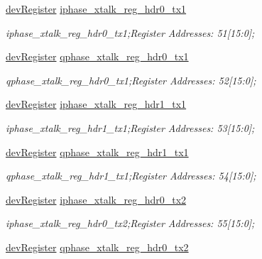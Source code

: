 \begin{DoxyCompactItemize}
\mbox{\hyperlink{classdev_register}{dev\+Register}} \mbox{\hyperlink{class_o_p_t3101_registers_a00e4c85b98322e5c98f2099e976129a5}{iphase\+\_\+xtalk\+\_\+reg\+\_\+hdr0\+\_\+tx1}}
\begin{DoxyCompactList}\small\item\em iphase\+\_\+xtalk\+\_\+reg\+\_\+hdr0\+\_\+tx1;Register Addresses\+: 51\mbox{[}15\+:0\mbox{]}; \end{DoxyCompactList}\item 
\mbox{\hyperlink{classdev_register}{dev\+Register}} \mbox{\hyperlink{class_o_p_t3101_registers_a01ead1a71055fd21fb738a4eb70df088}{qphase\+\_\+xtalk\+\_\+reg\+\_\+hdr0\+\_\+tx1}}
\begin{DoxyCompactList}\small\item\em qphase\+\_\+xtalk\+\_\+reg\+\_\+hdr0\+\_\+tx1;Register Addresses\+: 52\mbox{[}15\+:0\mbox{]}; \end{DoxyCompactList}\item 
\mbox{\hyperlink{classdev_register}{dev\+Register}} \mbox{\hyperlink{class_o_p_t3101_registers_a9fb218352b62437fa24b70b825843b7b}{iphase\+\_\+xtalk\+\_\+reg\+\_\+hdr1\+\_\+tx1}}
\begin{DoxyCompactList}\small\item\em iphase\+\_\+xtalk\+\_\+reg\+\_\+hdr1\+\_\+tx1;Register Addresses\+: 53\mbox{[}15\+:0\mbox{]}; \end{DoxyCompactList}\item 
\mbox{\hyperlink{classdev_register}{dev\+Register}} \mbox{\hyperlink{class_o_p_t3101_registers_ab0c5a42a9baac8f751b42f2cf107b25a}{qphase\+\_\+xtalk\+\_\+reg\+\_\+hdr1\+\_\+tx1}}
\begin{DoxyCompactList}\small\item\em qphase\+\_\+xtalk\+\_\+reg\+\_\+hdr1\+\_\+tx1;Register Addresses\+: 54\mbox{[}15\+:0\mbox{]}; \end{DoxyCompactList}\item 
\mbox{\hyperlink{classdev_register}{dev\+Register}} \mbox{\hyperlink{class_o_p_t3101_registers_afe3cb3f7b0e0763871b5d14d5bc95078}{iphase\+\_\+xtalk\+\_\+reg\+\_\+hdr0\+\_\+tx2}}
\begin{DoxyCompactList}\small\item\em iphase\+\_\+xtalk\+\_\+reg\+\_\+hdr0\+\_\+tx2;Register Addresses\+: 55\mbox{[}15\+:0\mbox{]}; \end{DoxyCompactList}\item 
\mbox{\hyperlink{classdev_register}{dev\+Register}} \mbox{\hyperlink{class_o_p_t3101_registers_a656421b9f1a180adb6963e3b6f7ca950}{qphase\+\_\+xtalk\+\_\+reg\+\_\+hdr0\+\_\+tx2}}

\end{DoxyCompactItemize}
